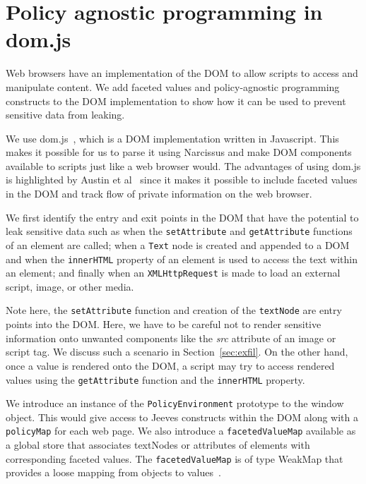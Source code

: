 \section{Policy agnostic programming in dom.js}
Web browsers have an implementation of the DOM to allow scripts to
access and manipulate content. We add faceted values and policy-agnostic programming
constructs to the DOM implementation to show how it can be used to prevent
sensitive data from leaking.

We use dom.js~\cite{dom.js}, which is a DOM implementation written in Javascript.
This makes it possible for us to parse it using Narcissus and make DOM components
available to scripts just like a web browser would. The advantages of using dom.js
is highlighted by Austin et al~\cite[Section 9.3]{TOPLAS} since it makes it possible
to include faceted values in the DOM and track flow of private information on the
web browser.

We first identify the entry and exit points in the DOM that have the potential
to leak sensitive data such as when the \texttt{setAttribute} and \texttt{getAttribute}
functions of an element are called; when a \texttt{Text} node is created
and appended to a DOM and when the \texttt{innerHTML} property of an element
is used to access the text within an element; and finally when an
\texttt{XMLHttpRequest} is made to load an external script, image, or other media.

Note here, the \texttt{setAttribute} function and creation of the \texttt{textNode}
are entry points into the DOM. Here, we have to be careful not to render sensitive
information onto unwanted components like the \textit{src} attribute of an image
or script tag. We discuss such a scenario in Section~\ref{sec:exfil}. On the
other hand, once a value is rendered onto the DOM, a script may try to access rendered
values using the \texttt{getAttribute} function and the \texttt{innerHTML} property.

We introduce an instance of the \texttt{PolicyEnvironment} prototype to the window
object. This would give access to Jeeves constructs within the DOM along with a
\texttt{policyMap} for each web page. We also introduce a \texttt{facetedValueMap}
available as a global store that associates textNodes or attributes of elements
with corresponding faceted values. The \texttt{facetedValueMap} is of
type WeakMap that provides a loose mapping from objects to values~\cite{WeakMap}.

